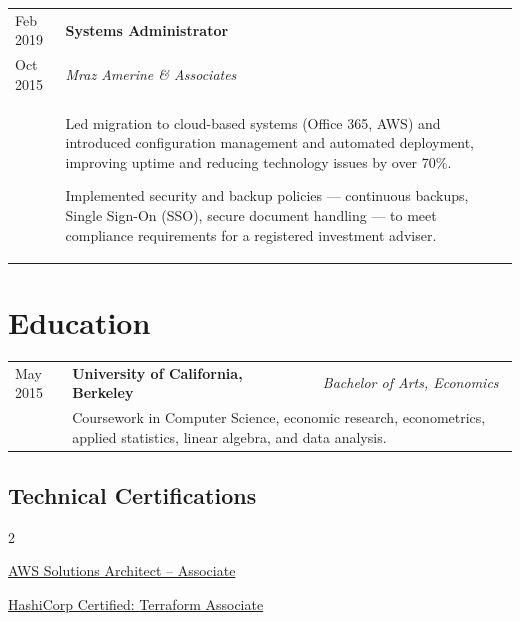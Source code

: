 \documentclass[10pt]{article}
\newcommand{\afterlistspace}[0]{\vspace{-1.5em}}
\begin{document}
\begin{tabular}{p{1.5cm}|p{16cm}}
    Feb 2019 & \textbf{Systems Administrator}
    \\
    Oct 2015 & \emph{Mraz Amerine \& Associates}
    \\
    & \begin{itemize}
        \setlength{\itemsep}{0.25em}
        \footnotesize{
            \item Led migration to cloud-based systems (Office 365, AWS) and introduced configuration management and automated deployment, improving uptime and reducing technology issues by over 70\%.
            
            \item Implemented security and backup policies — continuous backups, Single Sign-On (SSO), secure document handling — to meet compliance requirements for a registered investment adviser.
        }

        \afterlistspace
    \end{itemize}

\end{tabular}


\section{Education}

\begin{tabular}{p{1.5cm}|l|p{16cm}}
    May 2015 & \textbf{University of California, Berkeley} & \emph{Bachelor of Arts, Economics}
    \\
    & \multicolumn{2}{p{16cm}}{\footnotesize{Coursework in Computer Science, economic research, econometrics, applied statistics, linear algebra, and data analysis.}}
\end{tabular}



\subsection{Technical Certifications}

\begin{tcolorbox}[blanker]
        
    \begin{multicols}{2}
        \begin{itemize}
        \footnotesize{
            \item \href{https://www.youracclaim.com/badges/f3208524-d54a-4e0a-b47b-4b833036b2f6/public_url}{AWS Solutions Architect -- Associate}

            \item \href{https://www.youracclaim.com/badges/47ef53c6-f465-4201-ab7e-89249671183c/public_url}{HashiCorp Certified: Terraform Associate}
        }
        \end{itemize}
    \end{multicols}
\end{tcolorbox}
\end{document}

